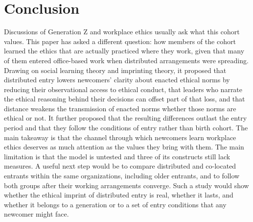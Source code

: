 \documentclass[12pt,a4paper]{article}
\theoremstyle{definition}
\begin{document}
\section{Conclusion}
Discussions of Generation Z and workplace ethics usually ask what this cohort values. This paper has asked a different question: how members of the cohort learned the ethics that are actually practiced where they work, given that many of them entered office-based work when distributed arrangements were spreading. Drawing on social learning theory and imprinting theory, it proposed that distributed entry lowers newcomers' clarity about enacted ethical norms by reducing their observational access to ethical conduct, that leaders who narrate the ethical reasoning behind their decisions can offset part of that loss, and that distance weakens the transmission of enacted norms whether those norms are ethical or not. It further proposed that the resulting differences outlast the entry period and that they follow the conditions of entry rather than birth cohort. The main takeaway is that the channel through which newcomers learn workplace ethics deserves as much attention as the values they bring with them. The main limitation is that the model is untested and three of its constructs still lack measures. A useful next step would be to compare distributed and co-located entrants within the same organizations, including older entrants, and to follow both groups after their working arrangements converge. Such a study would show whether the ethical imprint of distributed entry is real, whether it lasts, and whether it belongs to a generation or to a set of entry conditions that any newcomer might face.




\end{document}
